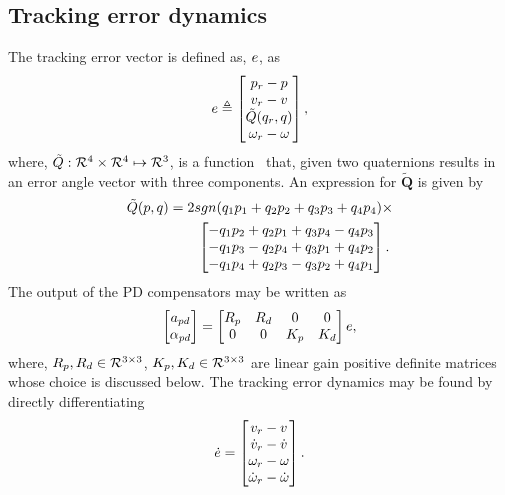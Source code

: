 \subsection{Tracking error dynamics}
\label{s:trackingerrordynamics} The tracking error
vector is defined as, $e$, as
\begin{equation}
\label{e:e} e \triangleq
\begin{bmatrix}
p_{r} - p \\
v_{r} - v \\
\tilde{Q}(q_{r},q) \\
\omega_{r} - \omega
\end{bmatrix},
\end{equation}
%
where, $\tilde{Q}:\mathcal{R}^{4}\times\mathcal{R}^{4} \mapsto \mathcal{R}^{3}$, is a
function~\cite{ejohnson:phd} that, given two quaternions results
in an error angle vector with three components. An expression for
$\tilde{\bm{Q}}$ is given by
%
\begin{align}
\label{e:quaterr}
\tilde{Q}(p,q) &= 2sgn(q_1p_1 + q_2p_2 + q_3p_3 + q_4p_4) \times \nonumber \\
&\qquad
\begin{bmatrix}
-q_1p_2 + q_2p_1 + q_3p_4 - q_4p_3 \\
-q_1p_3 - q_2p_4 + q_3p_1 + q_4p_2 \\
-q_1p_4 + q_2p_3 - q_3p_2 + q_4p_1
\end{bmatrix}.
\end{align}
%
The output of the PD compensators may be written as
%
\begin{equation}
\label{e:pdgains}
\begin{bmatrix}
a_{pd} \\
\alpha_{pd}
\end{bmatrix} =
\begin{bmatrix}
R_p & R_d & 0   &   0 \\
0   & 0   & K_p &   K_d
\end{bmatrix}e,
\end{equation}
%
where, $R_p,R_d \in \mathcal{R}^{3\times3}$, $K_p,K_d \in \mathcal{R}^{3\times3}$
are linear gain positive definite matrices whose choice is discussed
below. The tracking error dynamics may be found by directly
differentiating 
%
\[
\dot{e} =
\begin{bmatrix}
v_{r} - v \\
\dot{v}_{r} - \dot{v} \\
\omega_{r} - \omega \\
\dot{\omega}_{r} - \dot{\omega}
\end{bmatrix}.
\]
